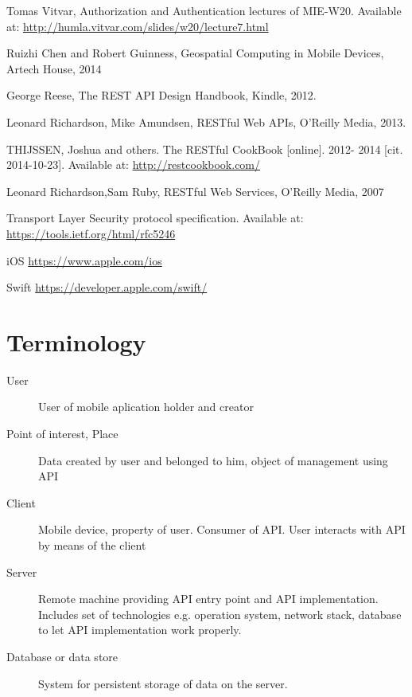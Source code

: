 \documentclass[thesis=M,english]{FITthesis}[2012/10/20]
\begin{document}
\begin{thebibliography}{9}


  Tomas Vitvar, Authorization and Authentication lectures of MIE-W20. Available at: \url{http://humla.vitvar.com/slides/w20/lecture7.html}

  Ruizhi Chen and Robert Guinness,
  Geospatial Computing in Mobile Devices,
  Artech House,
  2014

  George Reese,
  The REST API Design Handbook,
  Kindle,
  2012.

  Leonard Richardson,
  Mike Amundsen,
  RESTful Web APIs,
  O'Reilly Media,
  2013.

  THIJSSEN, Joshua and others. The RESTful CookBook [online]. 2012- 2014 [cit. 2014-10-23]. Available at: \url{http://restcookbook.com/}

  Leonard Richardson,Sam Ruby,
  RESTful Web Services,
  O'Reilly Media,
  2007

  Transport Layer Security protocol specification. Available at:  \url{https://tools.ietf.org/html/rfc5246}

  iOS \url{https://www.apple.com/ios}

  Swift \url{https://developer.apple.com/swift/}



\end{thebibliography}

%
%

\appendix

\chapter{Terminology}
\begin{description}
	\item[User] User of mobile aplication holder and creator
	\item[Point of interest, Place] Data created by user and belonged to him, object of management using API
	\item[Client] Mobile device, property of user. Consumer of API. User interacts with API by means of the client
	\item[Server] Remote machine providing API entry point and API implementation. Includes set of technologies e.g. operation system, network stack, database to let API implementation work properly.
	\item[Database or data store] System for persistent storage of data on the server.
\end{description}
\end{document}
